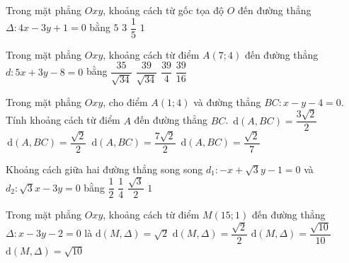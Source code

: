 \begin{ex}%
	Trong mặt phẳng  $Oxy$, khoảng cách từ gốc tọa độ $O$ đến đường thẳng $\Delta\colon 4x-3y+1=0$ bằng
	 \choice
		{$5$} 
		 {$3$}
		{\True  $\dfrac{1}{5}$}
		{$1$} 
\end{ex}

\begin{ex}%
	 Trong mặt phẳng $Oxy$, khoảng cách từ điểm $A(7;4)$ đến đường thẳng $d \colon 5x+3y-8=0$ bằng
	\choice 
		{$\dfrac{35}{\sqrt{34}}$} 
		 {\True $\dfrac{39}{\sqrt{34}}$}
		 {$\dfrac{39}{4}$}
		 {$\dfrac{39}{16}$}
\end{ex}

\begin{ex}%
	Trong mặt phẳng $Oxy$, cho điểm $A\left( 1;4 \right)$ và đường thẳng  $BC\colon x-y-4=0$. Tính khoảng cách từ điểm $A$ đến đường thẳng $BC$.
	\choice 
		{$\mathrm{\,d}\left(  A,BC \right)=\dfrac{3\sqrt{2}}{2}$}
		 {$\mathrm{\,d}\left( A,BC \right)=\dfrac{\sqrt{2}}{2}$}
		{\True $\mathrm{\,d}\left( A,BC  \right)=\dfrac{7\sqrt{2}}{2}$}
		{$\mathrm{\,d}\left(  A,BC \right)=\dfrac{\sqrt{2}}{7}$}
\end{ex}

\begin{ex}%
	Khoảng cách giữa hai đường thẳng song song $d_1\colon -x+\sqrt{3}y-1=0$ và $d_2\colon \sqrt{3}x-3y=0$ bằng 
	\choice 
		{\True  $\dfrac{1}{2}$}
		 {$\dfrac{1}{4}$}
		{$\dfrac{\sqrt{3}}{2}$} 
		{$1$} 
\end{ex}

\begin{ex}%
	Trong  mặt phẳng $Oxy$, khoảng cách từ điểm $M(15;1)$ đến đường thẳng $\Delta\colon x-3y-2=0$ là
	\choice 
		{$\mathrm{d}(M,\Delta)=\sqrt{2}$} 
		{$\mathrm{d}(M,\Delta)=\dfrac{\sqrt{2}}{2}$} 
		{$\mathrm{d}(M,\Delta)=\dfrac{\sqrt{10}}{10}$} 
		{\True  $\mathrm{d}(M,\Delta)=\sqrt{10}$}
\end{ex}

